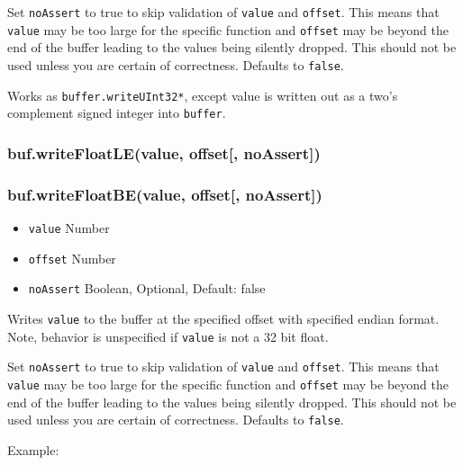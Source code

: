 Set \texttt{noAssert} to true to skip validation of \texttt{value} and
\texttt{offset}. This means that \texttt{value} may be too large for the
specific function and \texttt{offset} may be beyond the end of the
buffer leading to the values being silently dropped. This should not be
used unless you are certain of correctness. Defaults to \texttt{false}.

Works as \texttt{buffer.writeUInt32*}, except value is written out as a
two's complement signed integer into \texttt{buffer}.

\subsubsection{buf.writeFloatLE(value, offset{[},
noAssert{]})}\label{buf.writefloatlevalue-offset-noassert}

\subsubsection{buf.writeFloatBE(value, offset{[},
noAssert{]})}\label{buf.writefloatbevalue-offset-noassert}

\begin{itemize}
\itemsep1pt\parskip0pt
\item
  \texttt{value} Number
\item
  \texttt{offset} Number
\item
  \texttt{noAssert} Boolean, Optional, Default: false
\end{itemize}

Writes \texttt{value} to the buffer at the specified offset with
specified endian format. Note, behavior is unspecified if \texttt{value}
is not a 32 bit float.

Set \texttt{noAssert} to true to skip validation of \texttt{value} and
\texttt{offset}. This means that \texttt{value} may be too large for the
specific function and \texttt{offset} may be beyond the end of the
buffer leading to the values being silently dropped. This should not be
used unless you are certain of correctness. Defaults to \texttt{false}.

Example:

\begin{Shaded}
\begin{Highlighting}[]
  \NormalTok{(}\NormalTok{);}
\NormalTok{(}\NormalTok{, }\NormalTok{);}


\NormalTok{(}\NormalTok{, }\NormalTok{);}


\end{Highlighting}
\end{Shaded}

